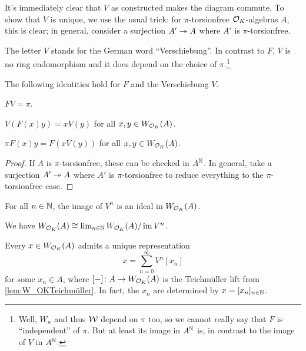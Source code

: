 \documentclass[a4paper, 10pt, oneside, DIV=9, chapterprefix=true, numbers=enddot,bibliography=totoc]{scrbook}
\begin{document}
\begin{proof*}
	It's immediately clear that $V$ as constructed makes the diagram commute. To show that $V$ is unique, we use the usual trick: for $\pi$-torsionfree $\mathcal{O}_K$-algebras $A$, this is clear; in general, consider a surjection $A'\epimorphism A$ where $A'$ is $\pi$-torsionfree.
\end{proof*}
The letter $V$ stands for the German word \enquote{Verschiebung}. In contrast to $F$, $V$ is no ring endomorphism and it does depend on the choice of $\pi$.\footnote{Well, $W_n$ and thus $\mathcal{W}$ depend on $\pi$ too, so we cannot really say that $F$ is \enquote{independent} of $\pi$. But at least its image in $A^{\mathbb{N}}$ is, in contrast to the image of $V$ in $A^{\mathbb{N}}$.}
\begin{lem}\label{lem:FVidentities}
	The following identities hold for $F$ and the Verschiebung $V$.
	\begin{numerate}
		\item $FV=\pi$.
		\item $V(F(x)y)=xV(y)$ for all $x,y\in W_{\mathcal{O}_K}(A)$.
		\item $\pi F(x)y=F(xV(y))$ for all $x,y\in W_{\mathcal{O}_K}(A)$. 
	\end{numerate}
\end{lem}
\begin{proof}
	If $A$ is $\pi$-torsionfree, these can be checked in $A^{\mathbb{N}}$. In general, take a surjection $A'\epimorphism A$ where $A'$ is $\pi$-torsionfree to reduce everything to the $\pi$-torsionfree case.
\end{proof}
\begin{lem}\label{lem:imVn}
	\begin{numerate}
		\item For all $n\in\mathbb{N}$, the image of $V^n$ is an ideal in $W_{\mathcal{O}_K}(A)$.
		\item We have $W_{\mathcal{O}_K}(A)\cong \lim_{n\in\mathbb{N}}W_{\mathcal{O}_K}(A)/\operatorname{im} V^n$.
		\item Every $x\in W_{\mathcal{O}_K}(A)$ admits a unique representation
		\begin{equation*}
			x=\sum_{n=0}^\infty V^n[x_n]
		\end{equation*}
		for some $x_n\in A$, where $[-]\colon A\morphism W_{\Oo_K}(A)$ is the Teichmüller lift from \cref{lem:W_OKTeichmüller}. In fact, the $x_n$ are determined by $x=[x_n]_{n\in\mathbb{N}}$.
	\end{numerate}
\end{lem}
\end{document}
